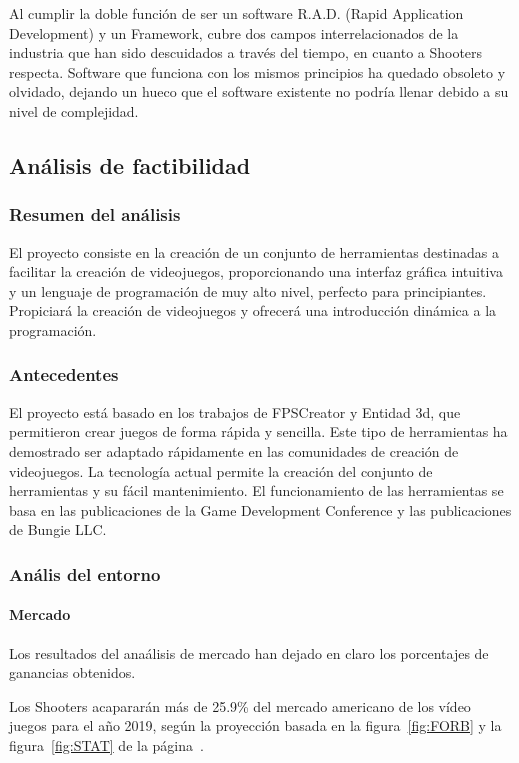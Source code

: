 \documentclass[]{article}
\begin{document}
Al cumplir la doble funci\'on de ser un software R.A.D. (Rapid Application Development) y un Framework, cubre dos campos interrelacionados de la industria que han sido descuidados a trav\'es del tiempo, en cuanto a Shooters respecta. 
Software que funciona con los mismos principios ha quedado obsoleto y olvidado, dejando un hueco que el software existente no podr\'ia llenar debido a su nivel de complejidad.

\subsection{An\'alisis de factibilidad}
\subsubsection{Resumen del an\'alisis}
El proyecto consiste en la creaci\'on de un conjunto de herramientas destinadas a facilitar la creaci\'on de videojuegos, proporcionando una interfaz gr\'afica intuitiva y un lenguaje de programaci\'on de muy alto nivel, perfecto para principiantes.
Propiciar\'a la creaci\'on de videojuegos y ofrecer\'a una introducci\'on din\'amica a la programaci\'on.
\subsubsection{Antecedentes}
El proyecto est\'a basado en los trabajos de FPSCreator y Entidad 3d, que permitieron crear juegos de forma r\'apida y sencilla.
Este tipo de herramientas ha demostrado ser adaptado r\'apidamente en las comunidades de creaci\'on de videojuegos. La tecnolog\'ia actual permite la creaci\'on del conjunto de herramientas y su f\'acil mantenimiento.
El funcionamiento de las herramientas se basa en las publicaciones de la Game Development Conference y las publicaciones de Bungie LLC.
\subsubsection{An\'alis del entorno}
\paragraph{Mercado}
Los resultados del ana\'alisis de mercado han dejado en claro los porcentajes de ganancias obtenidos. 

Los Shooters acaparar\'an m\'as de 25.9\% del  mercado americano de los v\'ideo juegos para el a\~no 2019, seg\'un la proyecci\'on basada en la figura~\ref{fig:FORB}  y la figura~\ref{fig:STAT} de la p\'agina~\pageref{fig:STAT}.
\end{document}
